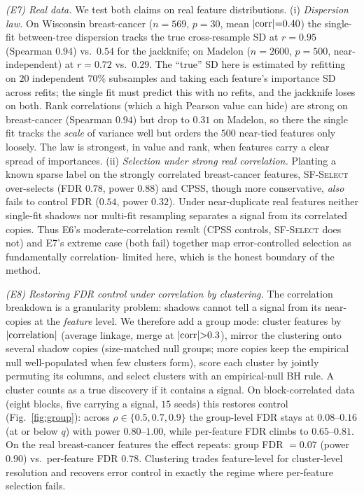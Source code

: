 \documentclass[conference]{IEEEtran}
\begin{document}
\emph{(E7) Real data.} We test both claims on real feature distributions.
(i) \emph{Dispersion law.} On Wisconsin breast-cancer ($n{=}569$, $p{=}30$,
mean $|{\rm corr}|{=}0.40$) the single-fit between-tree dispersion tracks the
true cross-resample SD at $r{=}0.95$ (Spearman $0.94$) vs.\ $0.54$ for the
jackknife; on Madelon ($n{=}2600$, $p{=}500$, near-independent) at $r{=}0.72$
vs.\ $0.29$. The ``true'' SD here is estimated by refitting on $20$ independent
$70\%$ subsamples and taking each feature's importance SD across refits; the
single fit must predict this with no refits, and the jackknife loses on both.
Rank correlations (which a high Pearson value can hide) are strong on
breast-cancer (Spearman $0.94$) but drop to $0.31$ on Madelon, so there the
single fit tracks the \emph{scale} of variance well but orders the $500$
near-tied features only loosely. The law is strongest, in value and rank, when
features carry a clear spread of importances. (ii) \emph{Selection under strong real correlation.}
Planting a known sparse label on the strongly correlated breast-cancer features,
\textsc{SF-Select} over-selects (FDR $0.78$, power $0.88$) and CPSS, though more
conservative, \emph{also} fails to control FDR ($0.54$, power $0.32$). Under
near-duplicate real features neither single-fit shadows nor multi-fit resampling
separates a signal from its correlated copies. Thus E6's moderate-correlation
result (CPSS controls, \textsc{SF-Select} does not) and E7's extreme case (both
fail) together map error-controlled selection as fundamentally correlation-
limited here, which is the honest boundary of the method.

\emph{(E8) Restoring FDR control under correlation by clustering.} The
correlation breakdown is a granularity problem: shadows cannot tell a signal
from its near-copies at the \emph{feature} level. We therefore add a group mode:
cluster features by $|{\rm correlation}|$ (average linkage, merge at
$|{\rm corr}|{>}0.3$), mirror the clustering onto several shadow copies
(size-matched null groups; more copies keep the empirical null well-populated
when few clusters form), score each cluster by jointly permuting its columns,
and select clusters with an empirical-null BH rule. A cluster counts as a true discovery if
it contains a signal. On block-correlated data (eight blocks, five carrying a
signal, $15$ seeds) this restores control (Fig.~\ref{fig:group}): across
$\rho\in\{0.5,0.7,0.9\}$ the group-level FDR stays at $0.08$--$0.16$ (at or below
$q$) with power $0.80$--$1.00$, while per-feature FDR climbs to $0.65$--$0.81$.
On the real breast-cancer features the effect repeats: group FDR $=0.07$
(power $0.90$) vs.\ per-feature FDR $0.78$. Clustering trades
feature-level for cluster-level resolution and recovers error control in exactly
the regime where per-feature selection fails.
\end{document}
